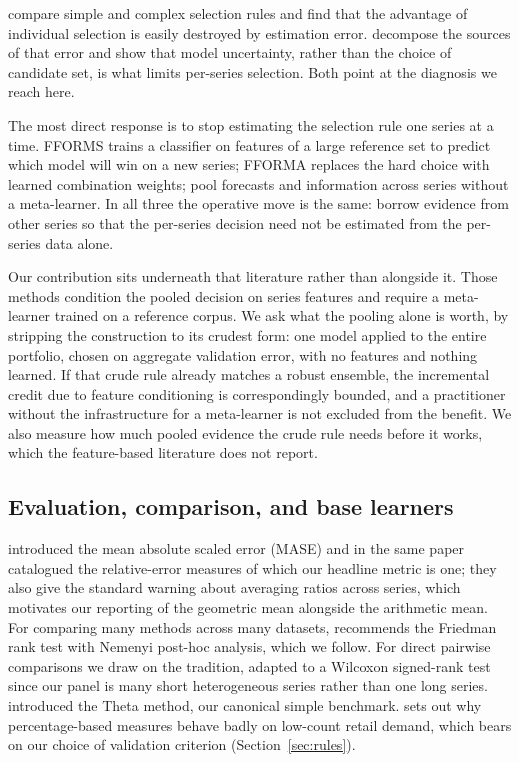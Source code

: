 \documentclass[11pt]{article}
\begin{document}
\citet{fildes2015} compare simple and complex selection rules and find that the advantage of individual selection is easily destroyed by estimation error. \citet{petropoulos2018} decompose the sources of that error and show that model uncertainty, rather than the choice of candidate set, is what limits per-series selection. Both point at the diagnosis we reach here.

The most direct response is to stop estimating the selection rule one series at a time. FFORMS \citep{talagala2023} trains a classifier on features of a large reference set to predict which model will win on a new series; FFORMA \citep{montero2020} replaces the hard choice with learned combination weights; \citet{kourentzes2019} pool forecasts and information across series without a meta-learner. In all three the operative move is the same: borrow evidence from other series so that the per-series decision need not be estimated from the per-series data alone.

Our contribution sits underneath that literature rather than alongside it. Those methods condition the pooled decision on series features and require a meta-learner trained on a reference corpus. We ask what the pooling alone is worth, by stripping the construction to its crudest form: one model applied to the entire portfolio, chosen on aggregate validation error, with no features and nothing learned. If that crude rule already matches a robust ensemble, the incremental credit due to feature conditioning is correspondingly bounded, and a practitioner without the infrastructure for a meta-learner is not excluded from the benefit. We also measure how much pooled evidence the crude rule needs before it works, which the feature-based literature does not report.

\subsection{Evaluation, comparison, and base learners}

\citet{hyndman2006} introduced the mean absolute scaled error (MASE) and in the same paper catalogued the relative-error measures of which our headline metric is one; they also give the standard warning about averaging ratios across series, which motivates our reporting of the geometric mean alongside the arithmetic mean. For comparing many methods across many datasets, \citet{demsar2006} recommends the Friedman rank test with Nemenyi post-hoc analysis, which we follow. For direct pairwise comparisons we draw on the \citet{diebold1995} tradition, adapted to a Wilcoxon signed-rank test since our panel is many short heterogeneous series rather than one long series. \citet{assimakopoulos2000} introduced the Theta method, our canonical simple benchmark. \citet{kolassa2016} sets out why percentage-based measures behave badly on low-count retail demand, which bears on our choice of validation criterion (Section~\ref{sec:rules}).
\end{document}
